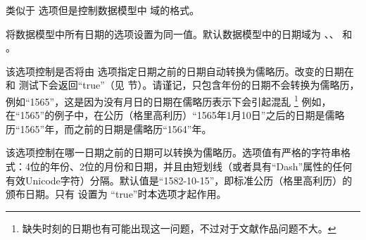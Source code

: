 \begin{optionlist}
类似于  选项但是控制数据模型中  域的格式。


将数据模型中所有日期的选项设置为同一值。默认数据模型中的日期域为 、、 和 。


该选项控制是否将由  选项指定日期之前的日期自动转换为儒略历。改变的日期在  和  测试下会返回“true”（见  节）。请谨记，只包含年份的日期不会转换为儒略历，例如“1565”，这是因为没有月日的日期在儒略历表示下会引起混乱
\footnote{缺失时刻的日期也有可能出现这一问题，不过对于文献作品问题不大。}
例如，在“1565”的例子中，在公历（格里高利历）“1565年1月10日”之后的日期是儒略历“1565”年，而之前的日期是儒略历“1564”年。


该选项控制在哪一日期之前的日期可以转换为儒略历。选项值有严格的字符串格式：4位的年份、2位的月份和日期，并且由短划线（或者具有“Dash”属性的任何有效Unicode字符）分隔。默认值是“1582-10-15”，即标准公历（格里高利历）的颁布日期。只有  设置为 “true”时本选项才起作用。


\end{optionlist}
